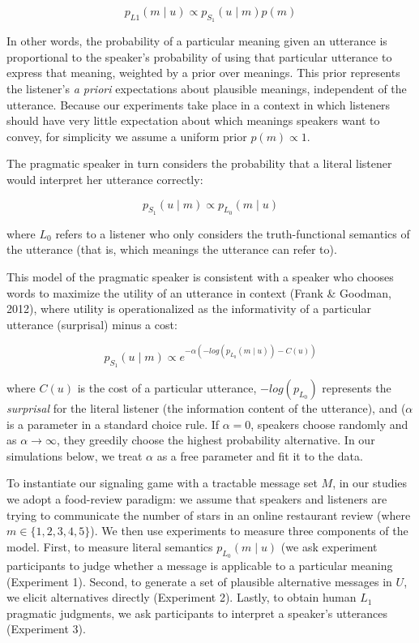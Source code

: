 \documentclass[10pt, letterpaper]{article}
\begin{document}
\[p_{L1}(m \mid u) \propto p_{S_1} (u \mid m) p(m)\]

\noindent In other words, the probability of a particular meaning given
an utterance is proportional to the speaker's probability of using that
particular utterance to express that meaning, weighted by a prior over
meanings. This prior represents the listener's \emph{a priori}
expectations about plausible meanings, independent of the utterance.
Because our experiments take place in a context in which listeners
should have very little expectation about which meanings speakers want
to convey, for simplicity we assume a uniform prior \(p(m) \propto 1\).

The pragmatic speaker in turn considers the probability that a literal
listener would interpret her utterance correctly:

\[ p_{S_1}(u \mid m) \propto p_{L_0} (m \mid u)\]

\noindent where \(L_0\) refers to a listener who only considers the
truth-functional semantics of the utterance (that is, which meanings the
utterance can refer to).

This model of the pragmatic speaker is consistent with a speaker who
chooses words to maximize the utility of an utterance in context (Frank
\& Goodman, 2012), where utility is operationalized as the informativity
of a particular utterance (surprisal) minus a cost:

\[p_{S_1}(u \mid m) \propto e^{-\alpha(-log(p_{L_0}(m \mid u)) - C(u))}\]

\noindent where \(C(u)\) is the cost of a particular utterance,
\(-log(p_{L_0})\) represents the \emph{surprisal} for the literal
listener (the information content of the utterance), and (\(\alpha\) is
a parameter in a standard choice rule. If \(\alpha=0\), speakers choose
randomly and as \(\alpha \rightarrow \infty\), they greedily choose the
highest probability alternative. In our simulations below, we treat
\(\alpha\) as a free parameter and fit it to the data.

To instantiate our signaling game with a tractable message set \(M\), in
our studies we adopt a food-review paradigm: we assume that speakers and
listeners are trying to communicate the number of stars in an online
restaurant review (where \(m \in \{1, 2, 3, 4, 5\}\)). We then use
experiments to measure three components of the model. First, to measure
literal semantics \({p_{L_0} (m \mid u)}\) (we ask experiment
participants to judge whether a message is applicable to a particular
meaning (Experiment 1). Second, to generate a set of plausible
alternative messages in \(U\), we elicit alternatives directly
(Experiment 2). Lastly, to obtain human \(L_1\) pragmatic judgments, we
ask participants to interpret a speaker's utterances (Experiment 3).
\end{document}
